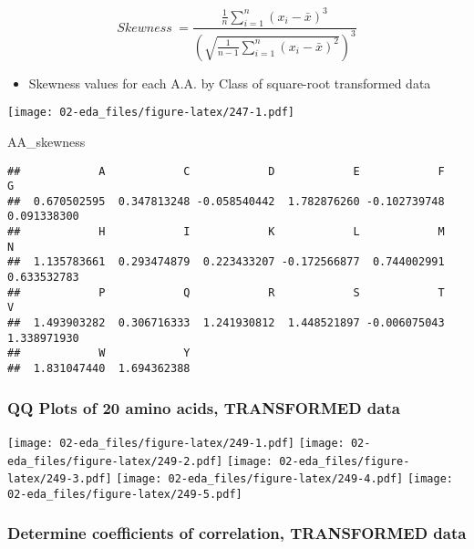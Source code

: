 \documentclass[]{article}
\newenvironment{Shaded}{\begin{snugshade}}{\end{snugshade}}
\newcommand{\NormalTok}[1]{#1}
\providecommand{\tightlist}{%
  \setlength{\itemsep}{0pt}\setlength{\parskip}{0pt}}
\begin{document}
\begin{equation} 
Skewness ~= \frac { \frac{1}{n} \sum^n_{i=1} (x_i - \bar x)^3 } { \left( \sqrt{ \frac{1}{n-1} \sum^n_{i=1} (x_i - \bar x)^2 } \right) ^ {3}}
\end{equation}

\begin{itemize}
\tightlist
\item
  Skewness values for each A.A. by Class of square-root transformed data
\end{itemize}

\texttt{[image: 02-eda\_files/figure-latex/247-1.pdf]}

\begin{Shaded}
\begin{Highlighting}[]
\NormalTok{AA_skewness}
\end{Highlighting}
\end{Shaded}

\begin{verbatim}
##            A            C            D            E            F            G 
##  0.670502595  0.347813248 -0.058540442  1.782876260 -0.102739748  0.091338300 
##            H            I            K            L            M            N 
##  1.135783661  0.293474879  0.223433207 -0.172566877  0.744002991  0.633532783 
##            P            Q            R            S            T            V 
##  1.493903282  0.306716333  1.241930812  1.448521897 -0.006075043  1.338971930 
##            W            Y 
##  1.831047440  1.694362388
\end{verbatim}

\hypertarget{qq-plots-of-20-amino-acids-transformed-data}{%
\subsubsection{QQ Plots of 20 amino acids, TRANSFORMED
data}\label{qq-plots-of-20-amino-acids-transformed-data}}

\texttt{[image: 02-eda\_files/figure-latex/249-1.pdf]}
\texttt{[image: 02-eda\_files/figure-latex/249-2.pdf]}
\texttt{[image: 02-eda\_files/figure-latex/249-3.pdf]}
\texttt{[image: 02-eda\_files/figure-latex/249-4.pdf]}
\texttt{[image: 02-eda\_files/figure-latex/249-5.pdf]}

\hypertarget{determine-coefficients-of-correlation-transformed-data}{%
\subsubsection{Determine coefficients of correlation, TRANSFORMED
data}\label{determine-coefficients-of-correlation-transformed-data}}
\end{document}
